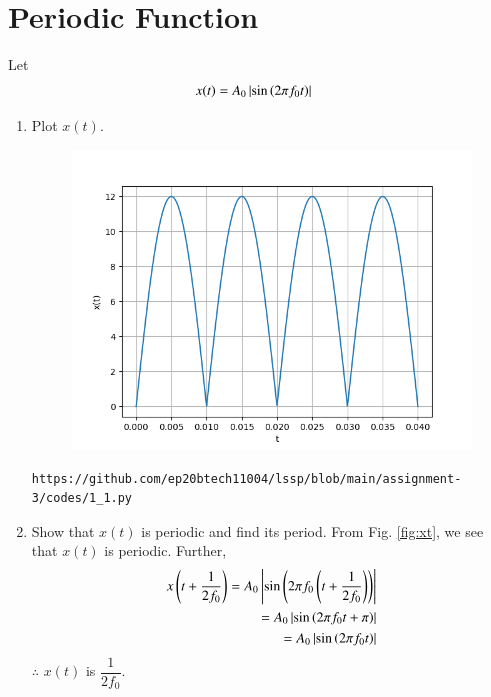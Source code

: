 \documentclass[journal,12pt,twocolumn]{IEEEtran}
\renewcommand\thesection{\arabic{section}}
\begin{document}
	\section{Periodic Function}
	Let 
	\begin{align}
		x(t) &= A_0\left\vert\sin\left(2\pi f_0 t\right)\right\vert
		\label{eq:10-orig-diff-def}
	\end{align}
	\begin{enumerate}[label=\thesection.\arabic*
		,ref=\thesection.\theenumi]
		\item Plot $x(t)$.\\
		\begin{figure}[!ht]
			\begin{center}
				\includegraphics[width=\columnwidth]{./figs/1_1.png}
			\end{center}
			\label{fig:xt}	
		\end{figure}
		\solution
		\begin{lstlisting}
https://github.com/ep20btech11004/lssp/blob/main/assignment-3/codes/1_1.py
		\end{lstlisting}
		
		\item Show that $x(t)$ is periodic and find its period.
		\solution From Fig. \eqref{fig:xt}, we see that $x(t)$ is periodic. Further,
		\begin{align}
			x\left(t+\frac{1}{2f_0}\right) = A_0\left\vert\sin\left(2\pi f_0\left(t + \frac{1}{2f_0}\right)\right)\right\vert \\
			= A_0\left\vert\sin\left(2\pi f_0t + \pi\right)\right\vert \\
			= A_0\left\vert\sin\left(2\pi f_0t\right)\right\vert
		\end{align}
		$\therefore$ $x(t)$ is $\dfrac{1}{2f_0}$.
		
	\end{enumerate}
\end{document}
